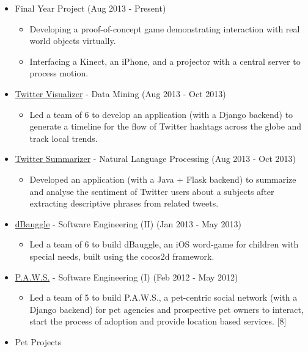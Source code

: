 \begin{itemize}
\tightlist
\item
  Final Year Project \hfill (Aug 2013 - Present)

  \begin{itemize}
  \tightlist
  \item
    Developing a proof-of-concept game demonstrating interaction with
    real world objects virtually.
  \item
    Interfacing a Kinect, an iPhone, and a projector with a central
    server to process motion.
  \end{itemize}
\item
  \href{https://github.com/radzinzki/Twitter-Visualiser}{Twitter
  Visualizer} - Data Mining \hfill (Aug 2013 - Oct 2013)

  \begin{itemize}
  \tightlist
  \item
    Led a team of 6 to develop an application (with a Django backend) to
    generate a timeline for the flow of Twitter hashtags across the
    globe and track local trends.
  \end{itemize}
\item
  \href{https://github.com/radzinzki/NLP}{Twitter Summarizer} - Natural
  Language Processing \hfill (Aug 2013 - Oct 2013)

  \begin{itemize}
  \tightlist
  \item
    Developed an application (with a Java + Flask backend) to summarize
    and analyse the sentiment of Twitter users about a subjects after
    extracting descriptive phrases from related tweets.
  \end{itemize}
\item
  \href{https://itunes.apple.com/us/app/dbauggle!/id625981185?mt=8}{dBauggle}
  - Software Engineering (II) \hfill (Jan 2013 - May 2013)

  \begin{itemize}
  \tightlist
  \item
    Led a team of 6 to build dBauggle, an iOS word-game for children
    with special needs, built using the cocos2d framework.
  \end{itemize}
\item
  \href{https://www.youtube.com/watch?v=kpMSL7KJ69w}{P.A.W.S.} -
  Software Engineering (I) \hfill (Feb 2012 - May 2012)

  \begin{itemize}
  \tightlist
  \item
    Led a team of 5 to build P.A.W.S., a pet-centric social network
    (with a Django backend) for pet agencies and prospective pet owners
    to interact, start the process of adoption and provide location
    based services. {[}8{]}
  \end{itemize}
\item
  Pet Projects


\end{itemize}

